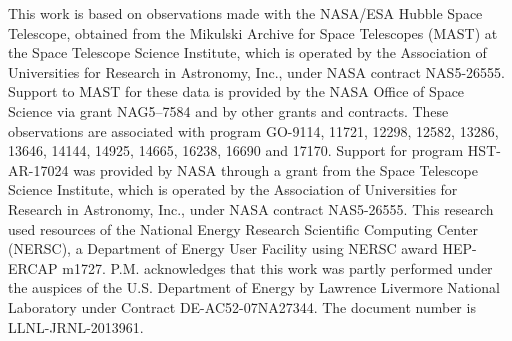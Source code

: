 \documentclass[twocolumn,tighten,times,floatfix]{aastex631}
\begin{document}
This work is based on observations made with the NASA/ESA Hubble Space Telescope, obtained from the Mikulski Archive for Space Telescopes (MAST) at the Space Telescope Science Institute, which is operated by the Association of Universities for Research in Astronomy, Inc., under NASA contract NAS5-26555. Support to MAST for these data is provided by the NASA Office of Space Science via grant NAG5–7584 and by other grants and contracts. These observations are associated with program GO-9114, 11721, 12298, 12582, 13286, 13646, 14144, 14925, 14665, 16238, 16690 and 17170. 
Support for program HST-AR-17024 was provided by NASA through a grant from the Space Telescope Science Institute, which is operated by the Association of Universities for Research in Astronomy, Inc., under NASA contract NAS5-26555.
This research used resources of the National Energy Research Scientific Computing Center (NERSC), a Department of Energy User Facility using NERSC award HEP-ERCAP m1727. P.M. acknowledges that this work was partly performed under the auspices of the U.S. Department of Energy by Lawrence Livermore National Laboratory under Contract DE-AC52-07NA27344. The document number is LLNL-JRNL-2013961.




%

\vspace{5mm}


\end{document}
